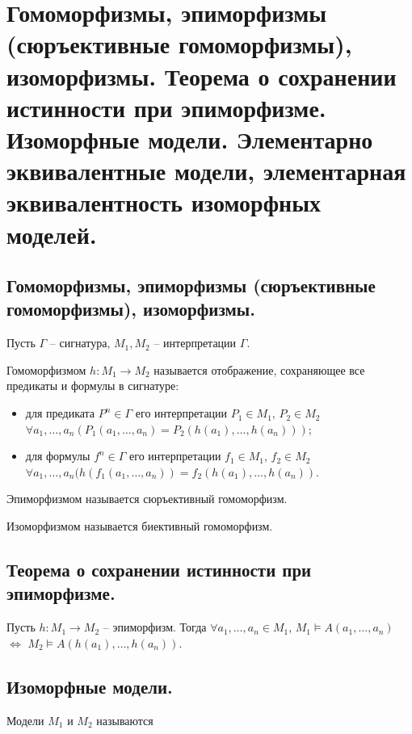 \section{Гомоморфизмы, эпиморфизмы (сюръективные гомоморфизмы), изоморфизмы. Теорема о сохранении истинности при эпиморфизме. Изоморфные модели. Элементарно эквивалентные модели, элементарная эквивалентность изоморфных моделей.}

\subsection{Гомоморфизмы, эпиморфизмы (сюръективные гомоморфизмы), изоморфизмы.}
Пусть $\Gamma$ -- сигнатура, $M_1, M_2$ -- интерпретации $\Gamma$.

\begin{definition}
  Гомоморфизмом $h : M_1 \to M_2$ называется отображение, сохраняющее все предикаты и формулы в сигнатуре:
  \begin{itemize}
    \item для предиката $P^n \in \Gamma$ его интерпретации $P_1 \in M_1$, $P_2 \in M_2$ $\forall a_1, \dots, a_n (P_1(a_1, \dots, a_n) = P_2(h(a_1), \dots, h(a_n)))$;
    \item для формулы $f^n \in \Gamma$ его интерпретации $f_1 \in M_1$, $f_2 \in M_2$ $\forall a_1, \dots, a_n (h(f_1(a_1, \dots, a_n)) = f_2(h(a_1), \dots, h(a_n))$.
   \end{itemize}
\end{definition}

\begin{definition}
  Эпиморфизмом называется сюръективный гомоморфизм.
\end{definition}

\begin{definition}
  Изоморфизмом называется биективный гомоморфизм.
\end{definition}

\subsection{Теорема о сохранении истинности при эпиморфизме.}

\begin{statement}
  Пусть $h : M_1 \to M_2$ -- эпиморфизм. Тогда $\forall a_1, \dots, a_n \in M_1$, $M_1 \vDash A(a_1, \dots, a_n)$ $\Leftrightarrow$ $M_2 \vDash A(h(a_1), \dots, h(a_n))$.

\end{statement}

\subsection{Изоморфные модели.}

\begin{definition}
  Модели $M_1$ и $M_2$ называются 
\end{definition}